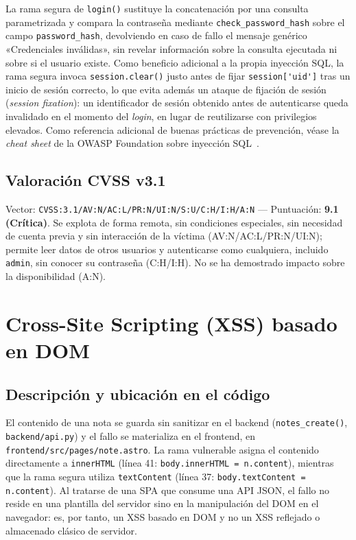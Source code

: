 La rama segura de \verb|login()| sustituye la concatenación por una consulta
parametrizada y compara la contraseña mediante \verb|check_password_hash|
sobre el campo \verb|password_hash|, devolviendo en caso de fallo el mensaje
genérico «Credenciales inválidas», sin revelar información sobre la consulta
ejecutada ni sobre si el usuario existe. Como beneficio adicional a la propia
inyección SQL, la rama segura invoca \verb|session.clear()| justo antes de
fijar \verb|session['uid']| tras un inicio de sesión correcto, lo que evita
además un ataque de fijación de sesión (\emph{session fixation}): un
identificador de sesión obtenido antes de autenticarse queda invalidado en
el momento del \emph{login}, en lugar de reutilizarse con privilegios
elevados. Como referencia adicional de buenas prácticas de prevención, véase
la \emph{cheat sheet} de la OWASP Foundation sobre inyección
SQL~.

\subsection{Valoración CVSS v3.1}

Vector: \texttt{CVSS:3.1/AV:N/AC:L/PR:N/UI:N/S:U/C:H/I:H/A:N} — Puntuación:
\textbf{9.1 (Crítica)}. Se explota de forma remota, sin condiciones
especiales, sin necesidad de cuenta previa y sin interacción de la víctima
(AV:N/AC:L/PR:N/UI:N); permite leer datos de otros usuarios y autenticarse
como cualquiera, incluido \texttt{admin}, sin conocer su contraseña
(C:H/I:H). No se ha demostrado impacto sobre la disponibilidad (A:N).

\section{Cross-Site Scripting (XSS) basado en DOM}
\label{sec:xss}

\subsection{Descripción y ubicación en el código}

El contenido de una nota se guarda sin sanitizar en el backend
(\verb|notes_create()|, \texttt{backend/api.py}) y el fallo se materializa
en el frontend, en \texttt{frontend/src/pages/note.astro}. La rama
vulnerable asigna el contenido directamente a \verb|innerHTML| (línea 41:
\texttt{body.innerHTML = n.content}), mientras que la rama segura utiliza
\verb|textContent| (línea 37: \texttt{body.textContent = n.content}). Al
tratarse de una SPA que consume una API JSON, el fallo no reside en una
plantilla del servidor sino en la manipulación del DOM en el navegador: es,
por tanto, un XSS basado en DOM y no un XSS reflejado o almacenado clásico
de servidor.

